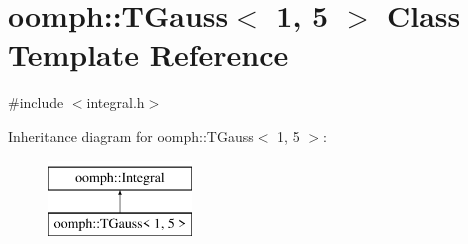 \hypertarget{classoomph_1_1TGauss_3_011_00_015_01_4}{}\section{oomph\+:\+:T\+Gauss$<$ 1, 5 $>$ Class Template Reference}
\label{classoomph_1_1TGauss_3_011_00_015_01_4}


{\ttfamily \#include $<$integral.\+h$>$}

Inheritance diagram for oomph\+:\+:T\+Gauss$<$ 1, 5 $>$\+:\begin{figure}[H]
\begin{center}
\leavevmode
\includegraphics[height=2.000000cm]{classoomph_1_1TGauss_3_011_00_015_01_4}
\end{center}
\end{figure}

